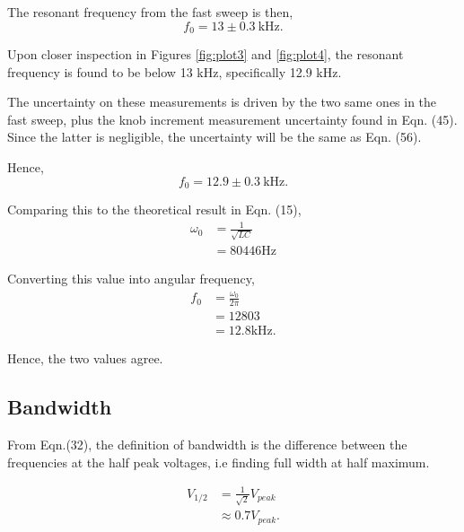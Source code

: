 \documentclass{article}
\begin{document}
The resonant frequency from the fast sweep is then,
\begin{equation}
    f_0 = 13 \pm 0.3 \: \text{kHz}.
\end{equation}

Upon closer inspection in Figures \ref{fig:plot3} and \ref{fig:plot4}, 
the resonant frequency is found to be below 13 kHz, specifically 12.9 kHz.

The uncertainty on these measurements is driven by the two same ones in the 
fast sweep, plus the knob increment measurement uncertainty found in Eqn. (45).
Since the latter is negligible, the uncertainty will be the same as Eqn. (56).

Hence, 
\begin{equation}
    f_0 = 12.9 \pm 0.3 \: \text{kHz.}
\end{equation}

Comparing this to the theoretical result in Eqn. (15),
\begin{equation}
    \begin{split}
        \omega_0 &= \frac{1}{\sqrt{LC}} \\
        &= 80446 \text{Hz}
    \end{split}
\end{equation}

Converting this value into angular frequency,
\begin{equation}
    \begin{split}
        f_0 &= \frac{\omega_0}{2\pi} \\
        &= 12803 \\
        &= 12.8 \text{kHz}.
    \end{split}
\end{equation}

Hence, the two values agree.

\subsection{Bandwidth}
From Eqn.(32), the definition of bandwidth is the difference between the 
frequencies at the half peak voltages, i.e finding full width at half 
maximum.

\begin{equation}
    \begin{split}
        V_{1/2} &= \frac{1}{\sqrt{2}}V_{peak} \\
        &\approx 0.7 V_{peak}.
    \end{split}
\end{equation}
\end{document}
